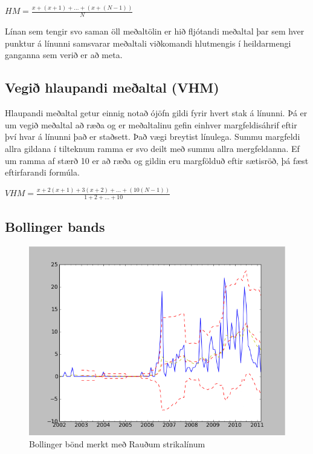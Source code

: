 \documentclass{article}
\begin{document}
\begin{center}
  $HM = \frac{x+(x+1)+\dots+(x+(N-1))}{N}$ 
\end{center}


Línan sem tengir svo saman öll meðaltölin er hið
fljótandi meðaltal þar sem hver punktur á línunni
samsvarar 
meðaltali viðkomandi hlutmengis í heildarmengi ganganna
sem verið er að meta. 
 
\subsection{Vegið hlaupandi meðaltal (VHM)}
\label{sec:weighted_running_average}
Hlaupandi meðaltal getur einnig notað ójöfn gildi fyrir
hvert stak á línunni.
Þá er um vegið meðaltal að ræða og er meðaltalinu gefin
einhver margfeldisáhrif eftir því hvar á línunni það er
staðsett. 
Það vægi breytist línulega. Summu margfeldi allra
gildana í tilteknum ramma er svo deilt með summu allra
mergfeldanna. 
Ef um ramma af stærð 10 er að ræða og gildin eru
margfölduð eftir sætisröð, þá fæst eftirfarandi formúla. 
\begin{center}
  $VHM = \frac{x+2(x+1)+3(x+2)+\dots+(10(N-1))}{1+2+\dots+10}$ 
\end{center}


\subsection{Bollinger bands}
\label{sec:bollinger_bands}

\begin{figure}
 \begin{center}
  \includegraphics[width=.58\textwidth]{Bollinger.png} 
  \caption{Bollinger bönd merkt með Rauðum strikalínum} 
  \end{center}
\end{figure}
\end{document}
